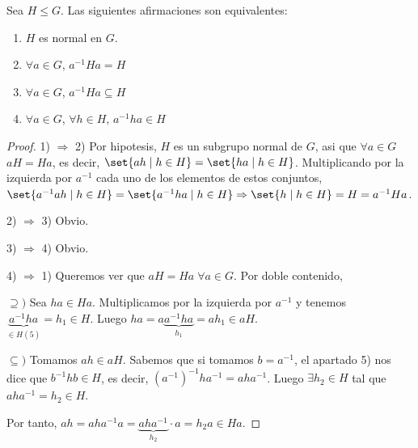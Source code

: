 \begin{theorem}
	Sea \(H \leq  G \). Las siguientes afirmaciones son equivalentes:
	\begin{enumerate}
		\item \(H \) es normal en \(G \).
		\item \(\forall a \in G \), \(a^{-1} H a = H \)
		\item \(\forall a \in G\), \(a^{-1} Ha \subseteq H \)
		\item \(\forall a \in G \), \(\forall h \in H \), \(a^{-1} h a \in H \)
	\end{enumerate}
\end{theorem}
\begin{proof}
	1) \(\Rightarrow \) 2) Por hipotesis, \(H \) es un subgrupo normal de \(G \), asi que \(\forall a \in G \) \(aH = Ha \), es decir, \(\set{ah \mid h \in H} = \set{ha \mid h \in H}\). Multiplicando por la izquierda por \(a^{-1} \) cada uno de los elementos de estos conjuntos, \(\set{a^{-1} a h
		\mid h \in H} = \set{a^{-1} ha \mid h \in H} \Rightarrow \set{h \mid h \in H} = H = a^{-1} Ha \).
	
	\vspace{0.2cm}
	2) \(\Rightarrow \) 3) Obvio.
	
	\vspace{0.2cm}
	3) \(\Rightarrow \) 4) Obvio.
	
	\vspace{0.2cm}
	4) \(\Rightarrow \) 1) Queremos ver que \(aH = Ha \; \forall a \in G \). Por doble contenido,
	
	\(\supseteq ) \) Sea \(ha \in Ha \). Multiplicamos por la izquierda por \(a^{-1}  \) y tenemos \(\underbrace{a^{-1} ha}_{\in H (5)} = h_1 \in H \). Luego \(ha = a \underbrace{a^{-1} h a}_{h_1} = ah_1 \in aH \).
	
	\(\subseteq ) \) Tomamos \(ah \in aH \). Sabemos que si tomamos \(b = a^{-1} \), el apartado 5) nos dice que \(b^{-1} h b \in H \), es decir, \((a^{-1} )^{-1} h a^{-1} = a h a^{-1} \). Luego \(\exists h_2 \in H \) tal que \(ah a^{-1} = h_2 \in H \).
	
	Por tanto, \(ah = ah a^{-1} a = \underbrace{a h a^{-1} }_{h_2} \cdot a = h_2 a \in Ha \).
\end{proof}

